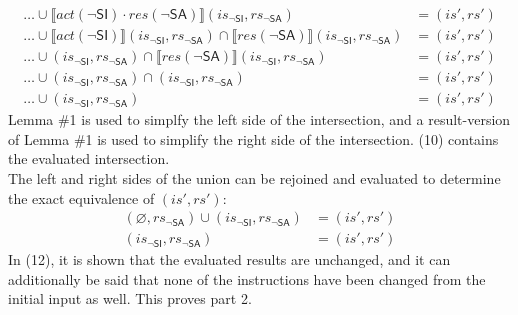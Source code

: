 \documentclass[12pt, letterpaper]{article}
\let\emptyset\varnothing
\begin{document}
 \begin{align}
     \ldots \cup %
     \llbracket \mathit{act}(\neg\mathsf{SI}) \cdot
      \mathit{res}(\neg\mathsf{SA}) \rrbracket (\mathit{is_{\mathsf{\neg SI}}}, \mathit{rs_{\mathsf{\neg SA}}})
     &=
     (\mathit{is}', \mathit{rs}')
     \\
     \ldots \cup %
     \llbracket \mathit{act}(\neg\mathsf{SI}) \rrbracket (\mathit{is_{\mathsf{\neg SI}}}, \mathit{rs_{\mathsf{\neg SA}}}) \cap
     \llbracket \mathit{res}(\neg\mathsf{SA}) \rrbracket (\mathit{is_{\mathsf{\neg SI}}}, \mathit{rs_{\mathsf{\neg SA}}})
     &=
     (\mathit{is}', \mathit{rs}')
     \\
     \ldots \cup %
     (\mathit{is_{\mathsf{\neg SI}}}, \mathit{rs_{\mathsf{\neg SA}}}) \cap
     \llbracket \mathit{res}(\neg\mathsf{SA}) \rrbracket (\mathit{is_{\mathsf{\neg SI}}}, \mathit{rs_{\mathsf{\neg SA}}})
     &=
     (\mathit{is}', \mathit{rs}')
     \\
     \ldots \cup %
     (\mathit{is_{\mathsf{\neg SI}}}, \mathit{rs_{\mathsf{\neg SA}}}) \cap
     (\mathit{is_{\mathsf{\neg SI}}}, \mathit{rs_{\mathsf{\neg SA}}})
     &=
     (\mathit{is}', \mathit{rs}')
     \\
     \ldots \cup %
     (\mathit{is_{\mathsf{\neg SI}}}, \mathit{rs_{\mathsf{\neg SA}}})
     &=
     (\mathit{is}', \mathit{rs}')
 \end{align}
     Lemma \#1 is used to simplfy the left side of the intersection, and a result-version of Lemma \#1 is used to simplify the right side of the intersection. (10) contains the evaluated intersection.\\
     The left and right sides of the union can be rejoined and evaluated to determine the exact equivalence of $(\mathit{is}', \mathit{rs}')$:
 \begin{align}
     (\emptyset, \mathit{rs_{\mathsf{\neg SA}}}) \cup
     (\mathit{is_{\mathsf{\neg SI}}}, \mathit{rs_{\mathsf{\neg SA}}})
     &=
     (\mathit{is}', \mathit{rs}')
     \\
     (\mathit{is_{\mathsf{\neg SI}}}, \mathit{rs_{\mathsf{\neg SA}}})
     &=
     (\mathit{is}', \mathit{rs}')
 \end{align}
     In (12), it is shown that the evaluated results are unchanged, and it can additionally be said that none of the instructions have been changed from the initial input as well.  This proves part 2.
\end{document}
